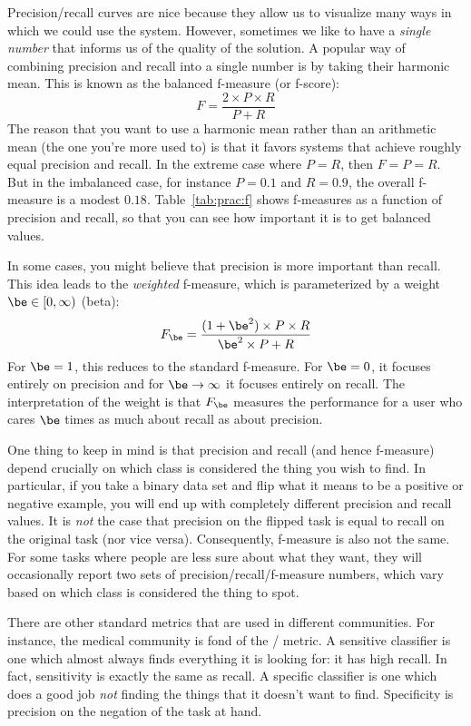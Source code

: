 Precision/recall curves are nice because they allow us to visualize
many ways in which we could use the system.  However, sometimes we
like to have a \emph{single number} that informs us of the quality of
the solution.  A popular way of combining precision and recall into a
single number is by taking their harmonic mean.  This is known as the
balanced f-measure (or f-score):
\begin{equation} \label{eq:f}
F = \frac {2\times P \times R} {P + R}
\end{equation}
The reason that you want to use a harmonic mean rather than an
arithmetic mean (the one you're more used to) is that it favors
systems that achieve roughly equal precision and recall.  In the
extreme case where $P=R$, then $F=P=R$.  But in the imbalanced case,
for instance $P=0.1$ and $R=0.9$, the overall f-measure is a modest
$0.18$.  Table~\ref{tab:prac:f} shows f-measures as a function of
precision and recall, so that you can see how important it is to get
balanced values.

In some cases, you might believe that precision is more important than
recall.  This idea leads to the \emph{weighted} f-measure, which is
parameterized by a weight $\be \in [0,\infty)$ (beta):
\begin{equation} \label{eq:f-weighted}
F_\be = \frac {(1 + \be^2) \times P \times R} {\be^2 \times P + R}
\end{equation}
For $\be=1$, this reduces to the standard f-measure.  For $\be = 0$, it
focuses entirely on precision and for $\be \rightarrow \infty$ it focuses
entirely on recall.  The interpretation of the weight is that
$F_\be$ measures the performance for a user who cares $\be$ times as
much about recall as about precision.

One thing to keep in mind is that precision and recall (and hence
f-measure) depend crucially on which class is considered the thing you
wish to find.  In particular, if you take a binary data set and flip
what it means to be a positive or negative example, you will end up
with completely different precision and recall values.  It is
\emph{not} the case that precision on the flipped task is equal to
recall on the original task (nor vice versa).  Consequently, f-measure
is also not the same.  For some tasks where people are less sure about
what they want, they will occasionally report two sets of
precision/recall/f-measure numbers, which vary based on which class is
considered the thing to spot.

There are other standard metrics that are used in different
communities.  For instance, the medical community is fond of the
/ metric.  A sensitive
classifier is one which almost always finds everything it is looking
for: it has high recall.  In fact, sensitivity is exactly the same as
recall.  A specific classifier is one which does a good job \emph{not}
finding the things that it doesn't want to find.  Specificity is
precision on the negation of the task at hand.

